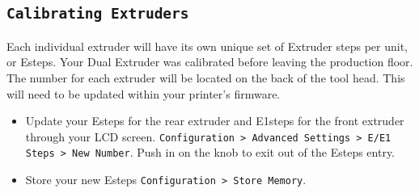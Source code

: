 \subsection{\texttt{Calibrating Extruders}}
Each individual extruder will have its own unique set of Extruder steps per unit, or Esteps. Your Dual Extruder was calibrated before leaving the production floor. The number for each extruder will be located on the back of the tool head. This will need to be updated within your printer's firmware.
\begin{itemize}
\item Update your Esteps for the rear extruder and E1steps for the front extruder through your LCD screen. \texttt{Configuration > Advanced Settings > E/E1 Steps > New Number}. Push in on the knob to exit out of the Esteps entry.
\item Store your new Esteps \texttt{Configuration > Store Memory}.
\end{itemize}

